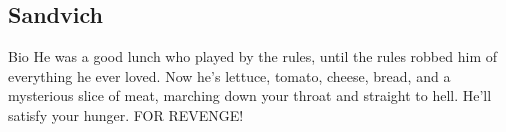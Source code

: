 \subsection{Sandvich}
Bio
He was a good lunch who played by the rules, until the rules robbed him of everything he ever loved. Now he's lettuce, tomato, cheese, bread, and a mysterious slice of meat, marching down your throat and straight to hell. He'll satisfy your hunger. FOR REVENGE!